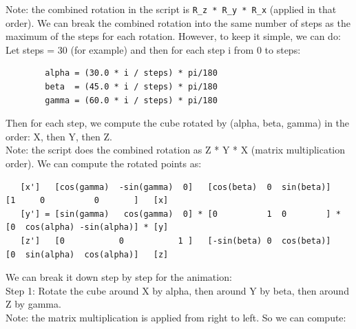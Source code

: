 \documentclass[a4paper,10pt]{article}
\begin{document}
Note: the combined rotation in the script is \verb|R_z * R_y * R_x| (applied in that order).
We can break the combined rotation into the same number of steps as the maximum of the steps for each rotation.
However, to keep it simple, we can do:\\
Let steps = 30 (for example) and then for each step i from 0 to steps:\\
\begin{verbatim}
        alpha = (30.0 * i / steps) * pi/180
        beta  = (45.0 * i / steps) * pi/180
        gamma = (60.0 * i / steps) * pi/180
\end{verbatim}
Then for each step, we compute the cube rotated by (alpha, beta, gamma) in the order: X, then Y, then Z.\\
Note: the script does the combined rotation as Z * Y * X (matrix multiplication order). We can compute the rotated points as:\\
{
\scriptsize
\begin{verbatim}
   [x']   [cos(gamma)  -sin(gamma)  0]   [cos(beta)  0  sin(beta)]   [1     0          0       ]   [x]
   [y'] = [sin(gamma)   cos(gamma)  0] * [0          1  0        ] * [0  cos(alpha) -sin(alpha)] * [y]
   [z']   [0           0           1 ]   [-sin(beta) 0  cos(beta)]   [0  sin(alpha)  cos(alpha)]   [z]
\end{verbatim}
}

We can break it down step by step for the animation:\\
Step 1: Rotate the cube around X by alpha, then around Y by beta, then around Z by gamma.\\
Note: the matrix multiplication is applied from right to left. So we can compute:\\
\end{document}

